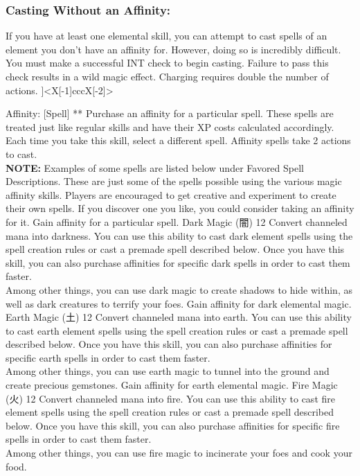 \begin{pathele}
\subsubsection{Casting Without an Affinity:}
	If you have at least one elemental skill, you can attempt to cast spells of an element you don't have an affinity for. However, doing so is incredibly difficult.
	You must make a successful INT check to begin casting. Failure to pass this check results in a wild magic effect. Charging requires double the number of actions.
]<X[-1]cccX[-2]>


\skilldescription
{Affinity: [Spell]}
{**}
{Purchase an affinity for a particular spell. These spells are treated just like regular skills and have their XP costs calculated accordingly. Each time you take this skill, select a different spell. Affinity spells take 2 actions to cast.\\
\textbf{NOTE:} Examples of some spells are listed below under Favored Spell Descriptions. These are just some of the spells possible using the various magic affinity skills. Players are encouraged to get creative and experiment to create their own spells. If you discover one you like, you could consider taking an affinity for it.}
{Gain affinity for a particular spell.}
\skilldescription
{Dark Magic {\jpfont(闇)}}
{12}
{Convert channeled mana into darkness. You can use this ability to cast dark element spells using the spell creation rules or cast a premade spell described below. Once you have this skill, you can also purchase affinities for specific dark spells in order to cast them faster.\\Among other things, you can use dark magic to create shadows to hide within, as well as dark creatures to terrify your foes.}
{Gain affinity for dark elemental magic.}
\skilldescription
{Earth Magic {\jpfont(土)}}
{12}
{Convert channeled mana into earth. You can use this ability to cast earth element spells using the spell creation rules or cast a premade spell described below. Once you have this skill, you can also purchase affinities for specific earth spells in order to cast them faster.\\Among other things, you can use earth magic to tunnel into the ground and create precious gemstones.}
{Gain affinity for earth elemental magic.}
\skilldescription
{Fire Magic {\jpfont(火)}}
{12}
{Convert channeled mana into fire. You can use this ability to cast fire element spells using the spell creation rules or cast a premade spell described below. Once you have this skill, you can also purchase affinities for specific fire spells in order to cast them faster.\\Among other things, you can use fire magic to incinerate your foes and cook your food.}

\end{pathele}
